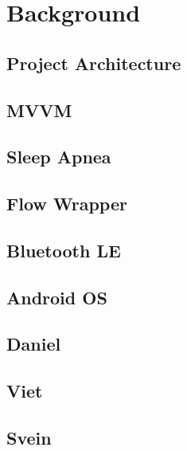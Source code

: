 \chapter{Background}

\section{Project Architecture}
\section{MVVM}
\section{Sleep Apnea}
\section{Flow Wrapper}
\section{Bluetooth LE}
\section{Android OS}

\section{Daniel}
\section{Viet}
\section{Svein}